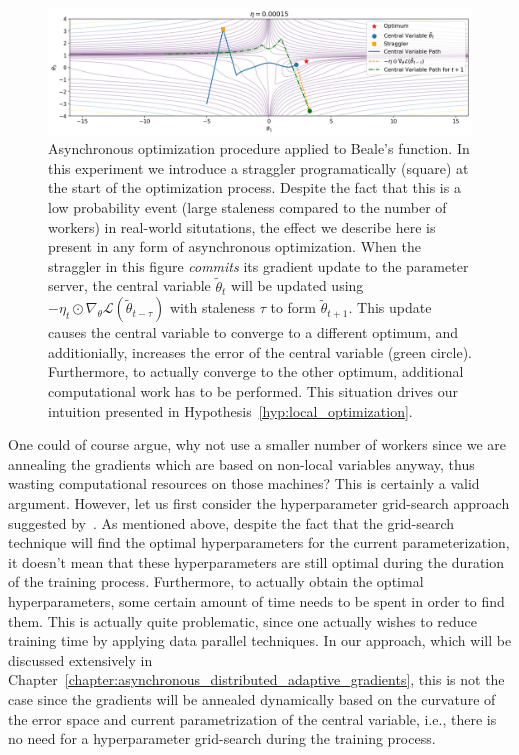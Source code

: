 \begin{figure}[H]
  \centering
  \includegraphics[width=\textwidth]{resources/images/async_straggler}
  \caption{Asynchronous optimization procedure applied to Beale's function. In this experiment we introduce a straggler programatically (square) at the start of the optimization process. Despite the fact that this is a low probability event (large staleness compared to the number of workers) in real-world situtations, the effect we describe here is present in any form of asynchronous optimization. When the straggler in this figure \emph{commits} its gradient update to the parameter server, the central variable $\tilde{\theta}_t$ will be updated using $-\eta_t \odot \nabla_\theta \mathcal{L}(\tilde{\theta}_{t - \tau})$ with staleness $\tau$ to form $\tilde{\theta}_{t+1}$. This update causes the central variable to converge to a different optimum, and additionially, increases the error of the central variable (green circle). Furthermore, to actually converge to the other optimum, additional computational work has to be performed. This situation drives our intuition presented in Hypothesis~\ref{hyp:local_optimization}.}
  \label{fig:async_momentum}
\end{figure}

One could of course argue, why not use a smaller number of workers since we are annealing the gradients which are based on non-local variables anyway, thus wasting computational resources on those machines? This is certainly a valid argument. However, let us first consider the hyperparameter grid-search approach suggested by~\cite{implicitmomentum}. As mentioned above, despite the fact that the grid-search technique will find the optimal hyperparameters for the current parameterization, it doesn't mean that these hyperparameters are still optimal during the duration of the training process. Furthermore, to actually obtain the optimal hyperparameters, some certain amount of time needs to be spent in order to find them. This is actually quite problematic, since one actually wishes to reduce training time by applying data parallel techniques. In our approach, which will be discussed extensively in Chapter~\ref{chapter:asynchronous_distributed_adaptive_gradients}, this is not the case since the gradients will be annealed dynamically based on the curvature of the error space and current parametrization of the central variable, i.e., there is no need for a hyperparameter grid-search during the training process.

